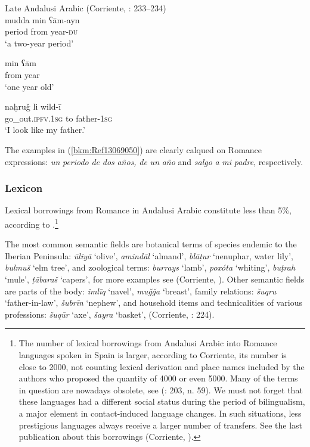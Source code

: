 \documentclass[output=paper,modfonts,nonflat]{langsci/langscibook}
\begin{document}
\ea\label{bkm:Ref13069050}
Late Andalusi Arabic (Corriente, \citealt{PereiraVicente2015}: 233–234)\\
\ea \gll mudda min ʕām-ayn\\
     period from year-\textsc{du}\\
\glt ‘a two-year period’



\ex\label{ex:key:}
\gll min ʕām\\
     from year\\
\glt ‘one year old’



\ex\label{ex:key:}
\gll naḫruǧ li wild-ī\\
  go\_out.\textsc{ipfv.1sg} to father-\textsc{1sg}\\
\glt ‘I look like my father.’
\z
\z

The examples in (\ref{bkm:Ref13069050}) are clearly calqued on Romance expressions: \textit{un} \textit{periodo} \textit{de} \textit{dos} \textit{años,} \textit{de} \textit{un} \textit{año} and \textit{salgo} \textit{a} \textit{mi} \textit{padre}, respectively. 
 
\subsubsection{Lexicon}




Lexical borrowings from Romance in Andalusi Arabic constitute less than 5\%, according to \citep[142]{Corriente1992}.\footnote{The number of lexical borrowings from Andalusi Arabic into Romance languages spoken in Spain is larger, {according to Corriente, its number is close to 2000, not counting lexical derivation and place names included by the authors who proposed the quantity of 4000 or even 5000.} Many of the terms in question are nowadays obsolete, see (\citealt{Corriente2005}: 203, n. 59). We must not forget that these languages had a different social status during the period of bilingualism, a major element in contact-induced language changes. In such situations, less prestigious languages always receive a larger number of transfers. See the last publication about this borrowings (Corriente, \citealt{PereiraVicente2019}).} 

The most common semantic fields are botanical terms of species endemic to the Iberian Peninsula: \textit{ūliyā} ‘olive’, \textit{amindāl} ‘almand’, \textit{blāṭur} ‘nenuphar, water lily’, \textit{bulmuš} ‘elm tree’, and zoological terms: \textit{burrays} ‘lamb’, \textit{poxóta} ‘whiting’, \textit{buṭrah} ‘mule’, \textit{ṭābaraš} ‘capers’, for more examples see (Corriente, \citealt{PereiraVicente2017}). Other semantic fields are parts of the body: \textit{imlīq}  ‘navel’, \textit{muǧǧa} ‘breast’, family relations: \textit{šuqru} ‘father-in-law’, \textit{šubrīn} ‘nephew’, and household items and technicalities of various professions: \textit{šuqūr} ‘axe’, \textit{šayra} ‘basket’, (Corriente, \citealt{PereiraVicente2015}: 224). 
\end{document}
